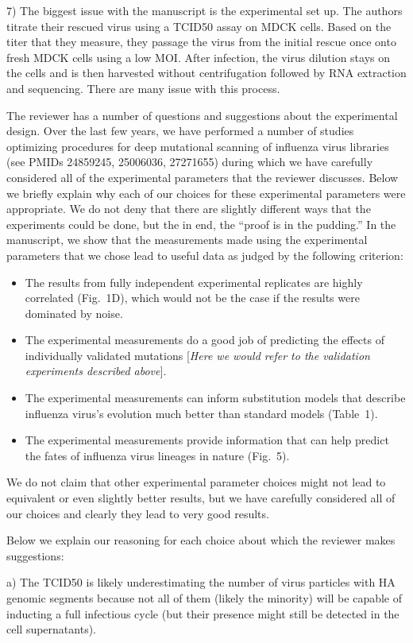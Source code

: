 \documentclass[11pt, oneside]{article}   	%
\newcommand{\comment}[1]{{\color{red}[\textsl{#1}]}}
\newcommand{\response}[1]{{\color{black}#1}}
\begin{document}
7) The biggest issue with the manuscript is the experimental set up. The authors titrate their rescued virus using a TCID50 assay on MDCK cells. Based on the titer that they measure, they passage the virus from the initial rescue once onto fresh MDCK cells using a low MOI. After infection, the virus dilution stays on the cells and is then harvested without centrifugation followed by RNA extraction and sequencing. There are many issue with this process. 

\response{The reviewer has a number of questions and suggestions about the experimental design.
Over the last few years, we have performed a number of studies optimizing procedures for deep mutational scanning of influenza virus libraries (see PMIDs 24859245, 25006036, 27271655) during which we have carefully considered all of the experimental parameters that the reviewer discusses.
Below we briefly explain why each of our choices for these experimental parameters were appropriate.
We do not deny that there are slightly different ways that the experiments could be done, but the in end, the ``proof is in the pudding.'' 
In the manuscript, we show that the measurements made using the experimental parameters that we chose lead to useful data as judged by the following criterion:
\begin{itemize}
\item The results from fully independent experimental replicates are highly correlated (Fig.~1D), which would not be the case if the results were dominated by noise.
\item The experimental measurements do a good job of predicting the effects of individually validated mutations \comment{Here we would refer to the validation experiments described above}.
\item The experimental measurements can inform substitution models that describe influenza virus's evolution much better than standard models (Table~1).
\item The experimental measurements provide information that can help predict the fates of influenza virus lineages in nature (Fig.~5).
\end{itemize}
We do not claim that other experimental parameter choices might not lead to equivalent or even slightly better results, but we have carefully considered all of our choices and clearly they lead to very good results.

Below we explain our reasoning for each choice about which the reviewer makes suggestions:
}

a) The TCID50 is likely underestimating the number of virus particles with HA genomic segments because not all of them (likely the minority) will be capable of inducting a full infectious cycle (but their presence might still be detected in the cell supernatants). 
\end{document}
